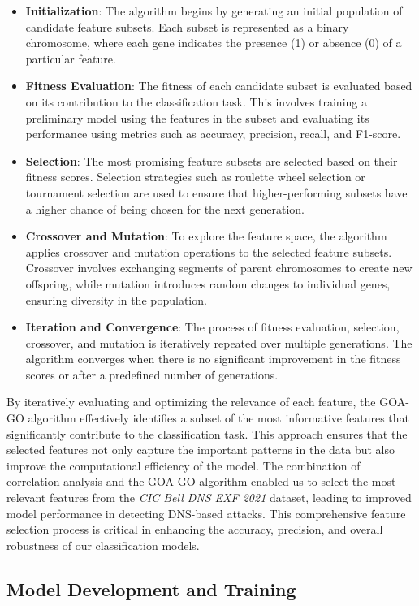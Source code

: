 \begin{itemize}
    \item \textbf{Initialization}: The algorithm begins by generating an initial population of candidate feature subsets. Each subset is represented as a binary chromosome, where each gene indicates the presence (1) or absence (0) of a particular feature.
    \item \textbf{Fitness Evaluation}: The fitness of each candidate subset is evaluated based on its contribution to the classification task. This involves training a preliminary model using the features in the subset and evaluating its performance using metrics such as accuracy, precision, recall, and F1-score.
    \item \textbf{Selection}: The most promising feature subsets are selected based on their fitness scores. Selection strategies such as roulette wheel selection or tournament selection are used to ensure that higher-performing subsets have a higher chance of being chosen for the next generation.
    \item \textbf{Crossover and Mutation}: To explore the feature space, the algorithm applies crossover and mutation operations to the selected feature subsets. Crossover involves exchanging segments of parent chromosomes to create new offspring, while mutation introduces random changes to individual genes, ensuring diversity in the population.
    \item \textbf{Iteration and Convergence}: The process of fitness evaluation, selection, crossover, and mutation is iteratively repeated over multiple generations. The algorithm converges when there is no significant improvement in the fitness scores or after a predefined number of generations.
\end{itemize}
By iteratively evaluating and optimizing the relevance of each feature, the GOA-GO algorithm effectively identifies a subset of the most informative features that significantly contribute to the classification task. This approach ensures that the selected features not only capture the important patterns in the data but also improve the computational efficiency of the model. The combination of correlation analysis and the GOA-GO algorithm enabled us to select the most relevant features from the \textit{CIC Bell DNS EXF 2021} dataset, leading to improved model performance in detecting DNS-based attacks. This comprehensive feature selection process is critical in enhancing the accuracy, precision, and overall robustness of our classification models.
\subsection{Model Development and Training}


